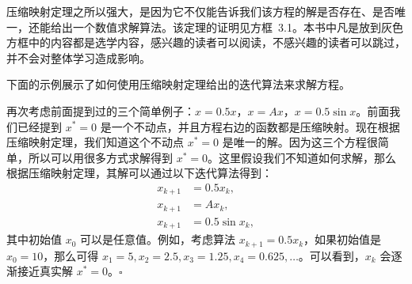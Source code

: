 压缩映射定理之所以强大，是因为它不仅能告诉我们该方程的解是否存在、是否唯一，还能给出一个数值求解算法。该定理的证明见方框~3.1。本书中凡是放到灰色方框中的内容都是选学内容，感兴趣的读者可以阅读，不感兴趣的读者可以跳过，并不会对整体学习造成影响。

下面的示例展示了如何使用压缩映射定理给出的迭代算法来求解方程。

\begin{example}
\label{ex:rl-contraction-iter}
再次考虑前面提到过的三个简单例子：$x = 0.5x$，$x = A x$，$x = 0.5 \sin x$。前面我们已经提到 $x^* = 0$ 是一个不动点，并且方程右边的函数都是压缩映射。现在根据压缩映射定理，我们知道这个不动点 $x^* = 0$ 是唯一的解。因为这三个方程很简单，所以可以用很多方式求解得到 $x^* = 0$。这里假设我们不知道如何求解，那么根据压缩映射定理，其解可以通过以下迭代算法得到：
\begin{align}
  x_{k+1} &= 0.5 x_k,\\
  x_{k+1} &= A x_k,\\
  x_{k+1} &= 0.5 \sin x_k,
\end{align}
其中初始值 $x_0$ 可以是任意值。例如，考虑算法 $x_{k+1} = 0.5 x_k$，如果初始值是 $x_0 = 10$，那么可得 $x_1 = 5, x_2 = 2.5, x_3 = 1.25, x_4 = 0.625, \ldots$。可以看到，$x_k$ 会逐渐接近真实解 $x^* = 0$。\hfill$\square$
\end{example}

